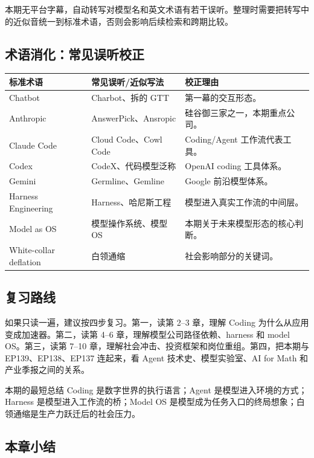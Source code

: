\documentclass[a4paper]{article}
\begin{document}
本期无平台字幕，自动转写对模型名和英文术语有若干误听。整理时需要把转写中的近似音统一到标准术语，否则会影响后续检索和跨期比较。

\subsection{术语消化：常见误听校正}

\noindent\begin{longtable}{p{}p{}p{}}
\toprule
标准术语 & 常见误听/近似写法 & 校正理由 \\
\midrule
Chatbot & Charbot、拆的 GTT & 第一幕的交互形态。 \\
Anthropic & AnswerPick、Ansropic & 硅谷御三家之一，本期重点公司。 \\
Claude Code & Cloud Code、Cowl Code & Coding/Agent 工作流代表工具。 \\
Codex & CodeX、代码模型泛称 & OpenAI coding 工具体系。 \\
Gemini & Germline、Gemline & Google 前沿模型体系。 \\
Harness Engineering & Harness、哈尼斯工程 & 模型进入真实工作流的中间层。 \\
Model as OS & 模型操作系统、模型 OS & 本期关于未来模型形态的核心判断。 \\
White-collar deflation & 白领通缩 & 社会影响部分的关键词。 \\
\bottomrule
\end{longtable}

\subsection{复习路线}

如果只读一遍，建议按四步复习。第一，读第 2--3 章，理解 Coding 为什么从应用变成加速器。第二，读第 4--6 章，理解模型公司路径依赖、harness 和 model OS。第三，读第 7--10 章，理解社会冲击、投资框架和岗位重组。第四，把本期与 EP139、EP138、EP137 连起来，看 Agent 技术史、模型实验室、AI for Math 和产业季报之间的关系。

\begin{knowledgebox}{本期的最短总结}
Coding 是数字世界的执行语言；Agent 是模型进入环境的方式；Harness 是模型进入工作流的桥；Model OS 是模型成为任务入口的终局想象；白领通缩是生产力跃迁后的社会压力。
\end{knowledgebox}

\subsection{本章小结}
\end{document}
